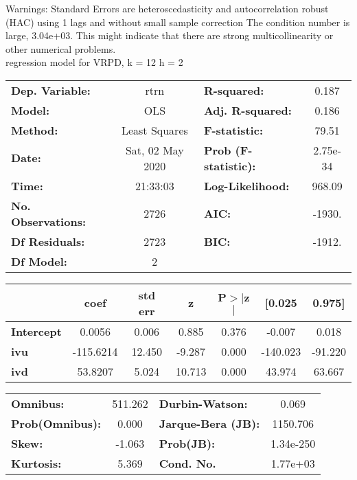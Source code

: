 Warnings: \newline
 [1] Standard Errors are heteroscedasticity and autocorrelation robust (HAC) using 1 lags and without small sample correction \newline
 [2] The condition number is large, 3.04e+03. This might indicate that there are \newline
 strong multicollinearity or other numerical problems.\\ 

regression model for VRPD, k = 12 h = 2\begin{center}
\begin{tabular}{lclc}
\toprule
\textbf{Dep. Variable:}    &       rtrn       & \textbf{  R-squared:         } &     0.187   \\
\textbf{Model:}            &       OLS        & \textbf{  Adj. R-squared:    } &     0.186   \\
\textbf{Method:}           &  Least Squares   & \textbf{  F-statistic:       } &     79.51   \\
\textbf{Date:}             & Sat, 02 May 2020 & \textbf{  Prob (F-statistic):} &  2.75e-34   \\
\textbf{Time:}             &     21:33:03     & \textbf{  Log-Likelihood:    } &    968.09   \\
\textbf{No. Observations:} &        2726      & \textbf{  AIC:               } &    -1930.   \\
\textbf{Df Residuals:}     &        2723      & \textbf{  BIC:               } &    -1912.   \\
\textbf{Df Model:}         &           2      & \textbf{                     } &             \\
\bottomrule
\end{tabular}
\begin{tabular}{lcccccc}
                   & \textbf{coef} & \textbf{std err} & \textbf{z} & \textbf{P$> |$z$|$} & \textbf{[0.025} & \textbf{0.975]}  \\
\midrule
\textbf{Intercept} &       0.0056  &        0.006     &     0.885  &         0.376        &       -0.007    &        0.018     \\
\textbf{ivu}       &    -115.6214  &       12.450     &    -9.287  &         0.000        &     -140.023    &      -91.220     \\
\textbf{ivd}       &      53.8207  &        5.024     &    10.713  &         0.000        &       43.974    &       63.667     \\
\bottomrule
\end{tabular}
\begin{tabular}{lclc}
\textbf{Omnibus:}       & 511.262 & \textbf{  Durbin-Watson:     } &     0.069  \\
\textbf{Prob(Omnibus):} &   0.000 & \textbf{  Jarque-Bera (JB):  } &  1150.706  \\
\textbf{Skew:}          &  -1.063 & \textbf{  Prob(JB):          } & 1.34e-250  \\
\textbf{Kurtosis:}      &   5.369 & \textbf{  Cond. No.          } &  1.77e+03  \\
\bottomrule
\end{tabular}
\end{center}

